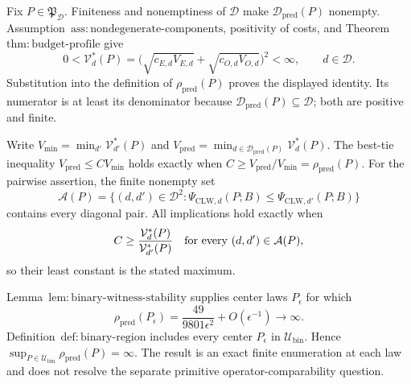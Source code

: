 Fix \(P\in\mathfrak P_{\mathcal D}\). Finiteness and nonemptiness of \(\mathcal D\) make \(\mathcal D_{\mathrm{pred}}(P)\) nonempty. Assumption~\(\mathrm{ass{:}nondegenerate\text{-}components}\), positivity of costs, and Theorem~\(\mathrm{thm{:}budget\text{-}profile}\) give
\[
0<\mathcal V_d^*(P)
=\bigl(\sqrt{c_{E,d}V_{E,d}}+\sqrt{c_{O,d}V_{O,d}}\bigr)^2
<\infty,\qquad d\in\mathcal D.
\]
Substitution into the definition of \(\rho_{\mathrm{pred}}(P)\) proves the displayed identity. Its numerator is at least its denominator because \(\mathcal D_{\mathrm{pred}}(P)\subseteq\mathcal D\); both are positive and finite.

Write \(V_{\min}=\min_{d'}\mathcal V_{d'}^*(P)\) and \(V_{\mathrm{pred}}=\min_{d\in\mathcal D_{\mathrm{pred}}(P)}\mathcal V_d^*(P)\). The best-tie inequality \(V_{\mathrm{pred}}\le CV_{\min}\) holds exactly when \(C\ge V_{\mathrm{pred}}/V_{\min}=\rho_{\mathrm{pred}}(P)\). For the pairwise assertion, the finite nonempty set
\[
\mathcal A(P)=\{(d,d')\in\mathcal D^2:
\Psi_{\mathrm{CLW},d}(P;B)\le\Psi_{\mathrm{CLW},d'}(P;B)\}
\]
contains every diagonal pair. All implications hold exactly when
\[
C\ge\frac{\mathcal V_d^*(P)}{\mathcal V_{d'}^*(P)}
\quad\hbox{for every }(d,d')\in\mathcal A(P),
\]
so their least constant is the stated maximum.

Lemma~\(\mathrm{lem{:}binary\text{-}witness\text{-}stability}\) supplies center laws \(P_\epsilon\) for which
\[
\rho_{\mathrm{pred}}(P_\epsilon)
=\frac{49}{9801\epsilon^2}+O(\epsilon^{-1})\longrightarrow\infty.
\]
Definition~\(\mathrm{def{:}binary\text{-}region}\) includes every center \(P_\epsilon\) in \(\mathcal U_{\mathrm{bin}}\). Hence \(\sup_{P\in\mathcal U_{\mathrm{bin}}}\rho_{\mathrm{pred}}(P)=\infty\). The result is an exact finite enumeration at each law and does not resolve the separate primitive operator-comparability question.